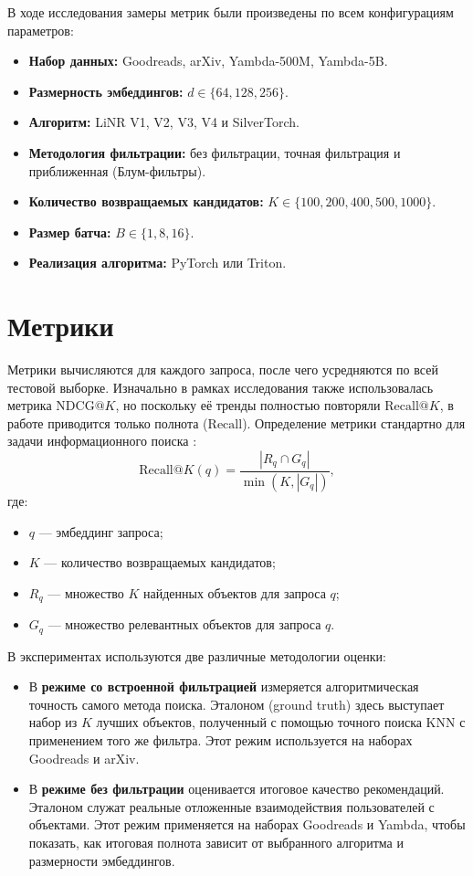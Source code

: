 \documentclass[14pt,a4paper]{extreport}
\numberwithin{figure}{chapter}
\numberwithin{table}{chapter}
\numberwithin{equation}{chapter}
\begin{document}
В ходе исследования замеры метрик были произведены по всем конфигурациям параметров:
\begin{itemize}
\item \textbf{Набор данных:} Goodreads, arXiv, Yambda-500M, Yambda-5B.
\item \textbf{Размерность эмбеддингов:} $d \in \{64, 128, 256\}$.
\item \textbf{Алгоритм:} LiNR V1, V2, V3, V4 и SilverTorch.
\item \textbf{Методология фильтрации:} без фильтрации, точная фильтрация и приближенная (Блум-фильтры).
\item \textbf{Количество возвращаемых кандидатов:} $K \in \{100, 200, 400, 500, 1000\}$.
\item \textbf{Размер батча:} $B \in \{1, 8, 16\}$.
\item \textbf{Реализация алгоритма:} PyTorch или Triton.
\end{itemize}

\section{Метрики}

Метрики вычисляются для каждого запроса, после чего усредняются по всей тестовой выборке. Изначально в рамках исследования также использовалась метрика $\mathrm{NDCG@}K$, но поскольку её тренды полностью повторяли $\mathrm{Recall@}K$, в работе приводится только полнота ($\mathrm{Recall}$). Определение метрики стандартно для задачи информационного поиска \cite{thakur2021beir}:
\begin{equation}
\mathrm{Recall@}K(q) = \frac{|R_q \cap G_q|}{\min(K, |G_q|)},
\end{equation}
где:
\begin{itemize}
    \item $q$ --- эмбеддинг запроса;
    \item $K$ --- количество возвращаемых кандидатов;
    \item $R_q$ --- множество $K$ найденных объектов для запроса $q$;
    \item $G_q$ --- множество релевантных объектов для запроса $q$.
\end{itemize}

В экспериментах используются две различные методологии оценки:
\begin{itemize}
\item В \textbf{режиме со встроенной фильтрацией} измеряется алгоритмическая точность самого метода поиска. Эталоном (ground truth) здесь выступает набор из $K$ лучших объектов, полученный с помощью точного поиска KNN с применением того же фильтра. Этот режим используется на наборах Goodreads и arXiv.
\item В \textbf{режиме без фильтрации} оценивается итоговое качество рекомендаций. Эталоном служат реальные отложенные взаимодействия пользователей с объектами. Этот режим применяется на наборах Goodreads и Yambda, чтобы показать, как итоговая полнота зависит от выбранного алгоритма и размерности эмбеддингов.
\end{itemize}
\end{document}
